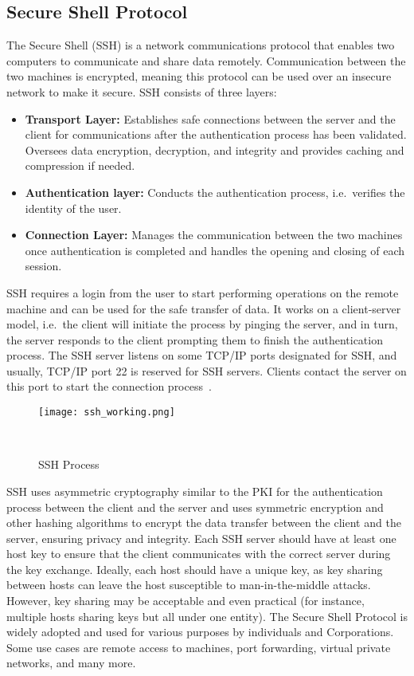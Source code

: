 \subsection{Secure Shell Protocol}
The Secure Shell (SSH) is a network communications protocol that enables two computers to communicate and share data remotely. 
Communication between the two machines is encrypted, meaning this protocol can be used over an insecure network to make it secure.
SSH consists of three layers: 
\begin{itemize}
    \item \textbf{Transport Layer:} Establishes safe connections between the server and the client for communications after the authentication process has been validated. Oversees data encryption, decryption, and integrity and provides caching and compression if needed. 
    \item \textbf{Authentication layer:} Conducts the authentication process, i.e.\ verifies the identity of the user.
    \item \textbf{Connection Layer:} Manages the communication between the two machines once authentication is completed and handles the opening and closing of each session. 
\end{itemize}

\noindent SSH requires a login from the user to start performing operations on the remote machine and can be used for the safe transfer of data. 
It works on a client-server model, i.e.\ the client will initiate the process by pinging the server, and in turn, the server responds to the client prompting them 
to finish the authentication process. The SSH server listens on some TCP/IP ports designated for SSH, and usually, TCP/IP port 22 is reserved for SSH servers.
Clients contact the server on this port to start the connection process~\cite{rfc4254}.

\begin{figure}[h!]
    \centering
    \texttt{[image: ssh\_working.png]}
    \caption{SSH Process}~\cite{LearnSSH25:online}
    \label{fig: SSHworking}
\end{figure}

\noindent SSH uses asymmetric cryptography similar to the PKI for the authentication process between the client and the server and uses symmetric encryption and other hashing algorithms
to encrypt the data transfer between the client and the server, ensuring privacy and integrity. Each SSH server should have at least one host key to ensure 
that the client communicates with the correct server during the key exchange. Ideally, each host should have a unique key, as key sharing between hosts can leave the host 
susceptible to man-in-the-middle attacks. However, key sharing may be acceptable and even practical (for instance, multiple hosts sharing keys but all under one entity). The Secure Shell Protocol is widely adopted and used for various purposes by individuals and Corporations. 
Some use cases are remote access to machines, port forwarding, virtual private networks, and many more.  

